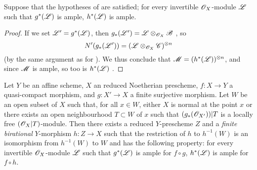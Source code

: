 \begin{corollary}[6.6.10]
\label{II.6.6.10}
Suppose that the hypotheses of  are satisfied;
for every invertible $\mathscr{O}_X$-module $\mathscr{L}$ such that $g^*(\mathscr{L})$ is ample, $h^*(\mathscr{L})$ is ample.
\end{corollary}

\begin{proof}
If we set $\mathscr{L}'=g^*(\mathscr{L})$, then $g_*(\mathscr{L}')=\mathscr{L}\otimes_{\mathscr{O}_X}\mathscr{B}$ , so
\[
  N'(g_*(\mathscr{L}')) = (\mathscr{L}\otimes_{\mathscr{O}_X}\mathscr{C})^{\otimes n}
\]
(by the same argument as for ).
We thus conclude that $\mathscr{M}=(h^*(\mathscr{L}))^{\otimes n}$, and since $\mathscr{M}$ is ample, so too is $h^*(\mathscr{L})$ .
\end{proof}

\begin{proposition}[6.6.11]
\label{II.6.6.11}
Let $Y$ be an affine scheme, $X$ an reduced Noetherian prescheme, $f:X\to Y$ a quasi-compact morphism, and $g:X'\to X$ a finite surjective morphism.
Let $W$ be an open subset of $X$ such that, for all $x\in W$, either $X$ is normal at the point $x$ or there exists an open neighbourhood $T\subset W$ of $x$ such that $(g_*(\mathscr{O}_{X'}))|T$ is a locally free $(\mathscr{O}_X|T)$-module.
Then there exists a reduced $Y$-prescheme $Z$ and a \emph{finite birational} $Y$-morphism $h:Z\to X$ such that the restriction of $h$ to $h^{-1}(W)$ is an isomorphism from $h^{-1}(W)$ to $W$ and has the following property: for every invertible $\mathscr{O}_X$-module $\mathscr{L}$ such that $g^*(\mathscr{L})$ is ample for $f\circ g$, $h^*(\mathscr{L})$ is ample for $f\circ h$.
\end{proposition}


